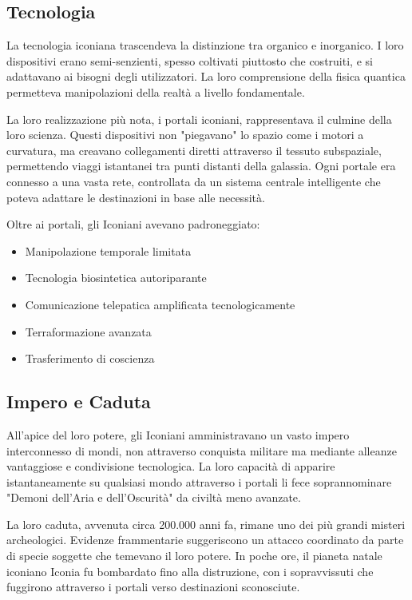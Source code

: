 \documentclass[letterpaper,twocolumn,openany,nodeprecatedcode]{dndbook}
\begin{document}
\subsection{Tecnologia}

La tecnologia iconiana trascendeva la distinzione tra organico e inorganico. I loro dispositivi erano semi-senzienti, spesso coltivati piuttosto che costruiti, e si adattavano ai bisogni degli utilizzatori. La loro comprensione della fisica quantica permetteva manipolazioni della realtà a livello fondamentale.

La loro realizzazione più nota, i portali iconiani, rappresentava il culmine della loro scienza. Questi dispositivi non "piegavano" lo spazio come i motori a curvatura, ma creavano collegamenti diretti attraverso il tessuto subspaziale, permettendo viaggi istantanei tra punti distanti della galassia. Ogni portale era connesso a una vasta rete, controllata da un sistema centrale intelligente che poteva adattare le destinazioni in base alle necessità.

Oltre ai portali, gli Iconiani avevano padroneggiato:
\begin{itemize}
    \item Manipolazione temporale limitata
    \item Tecnologia biosintetica autoriparante
    \item Comunicazione telepatica amplificata tecnologicamente
    \item Terraformazione avanzata
    \item Trasferimento di coscienza
\end{itemize}

\subsection{Impero e Caduta}

All'apice del loro potere, gli Iconiani amministravano un vasto impero interconnesso di mondi, non attraverso conquista militare ma mediante alleanze vantaggiose e condivisione tecnologica. La loro capacità di apparire istantaneamente su qualsiasi mondo attraverso i portali li fece soprannominare "Demoni dell'Aria e dell'Oscurità" da civiltà meno avanzate.

La loro caduta, avvenuta circa 200.000 anni fa, rimane uno dei più grandi misteri archeologici. Evidenze frammentarie suggeriscono un attacco coordinato da parte di specie soggette che temevano il loro potere. In poche ore, il pianeta natale iconiano Iconia fu bombardato fino alla distruzione, con i sopravvissuti che fuggirono attraverso i portali verso destinazioni sconosciute.
\end{document}
